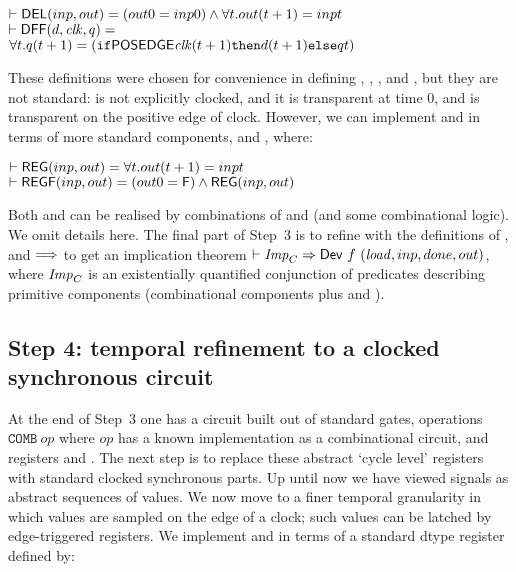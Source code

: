 \vspace*{-2mm}

{\begin{alltt}
\( \vdash \DEF{DEL}(inp,out) = (out 0 = inp 0) \wedge {\forall}t. out(t+1) = inp t                       \)
\( \vdash \DEF{DFF}(d,\VAR{clk},q) =                                                                           \)
\(     {\forall}t. q(t+1) = (\texttt{if} \DEF{POSEDGE} \VAR{clk} (t+1) \texttt{then} d(t+1) \texttt{else} q t) \)
\end{alltt}}

\vspace*{-2mm}

These definitions were chosen for convenience in defining
, , ,  and , but they are not standard:
 is not explicitly clocked, and it is transparent at time $0$,
and
 is transparent on the positive edge of clock. 
However, we can implement  and  in terms of more
standard components,   and , where:

{\baselineskip16pt\begin{alltt}
\( \vdash \DEF{REG}(inp,out) = {\forall}t. out(t+1) = inp t          \)
\( \vdash \DEF{REGF}(inp,out) = (out 0 = \DEF{F}) \wedge \DEF{REG}(inp,out)\)
\end{alltt}}

Both  and  can be realised by combinations of
 and  (and some combinational logic). We omit
details here. The final part of Step~3 is to refine with the
definitions of ,  and $\Longrightarrow$ to get an implication
theorem $\vdash {\it{Imp}}_C \Rightarrow \mathsf{Dev}~f~(\mathit{load},inp,done,out)$, where ${\it{Imp}}_C$
is an existentially quantified conjunction of predicates describing
primitive components (combinational components plus  and
).

\vspace*{-3mm}

\subsection*{Step 4: temporal refinement to a clocked synchronous circuit}

At the end of Step~3 one has a circuit built out of standard gates,
operations $\texttt{COMB}~op$ where $op$ has a known implementation as
a combinational circuit, and registers  and .  The
next step is to replace these abstract `cycle level' registers with
standard clocked synchronous parts. Up until now we have viewed
signals as abstract sequences of values.  We now move to a finer
temporal granularity in which values are sampled on the edge of a
clock; such values can be latched by edge-triggered registers. We
implement  and  in terms of a standard dtype
register defined by:

